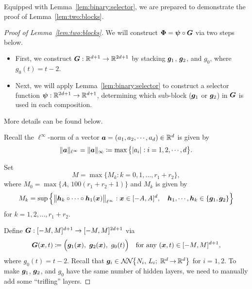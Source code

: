 \documentclass[nohyperref]{article}
\theoremstyle{plain}
\theoremstyle{definition}
\theoremstyle{remark}
\begin{document}
Equipped with Lemma~\ref{lem:binary:selector}, we are prepared to demonstrate the proof of Lemma~\ref{lem:two:blocks}.
\begin{proof}[Proof of Lemma~\ref{lem:two:blocks}]
	We will construct ${\bm{\Phi}}={\bm{\psi}}\circ {\bm{G}}$ via two steps below.
	\begin{itemize}
		\item First, we construct $\bmG:\R^{d+1}\to\R^{2d+1}$  by stacking ${\bm{g}}_1$, ${\bm{g}}_2$, and $g_0$, where $g_0(t)=t-2$.
		\item Next, we will apply Lemma~\ref{lem:binary:selector} to construct a selector function $\bmpsi:\R^{2d+1}\to\R^{d+1}$, determining which sub-block (${\bm{g}}_1$ or ${\bm{g}}_2$) in ${\bm{G}}$ is used in each composition.
	\end{itemize} 
	More details can be found below.
	
	
	
	
	
			Recall the $\ell^\infty$-norm of a vector $\bma=(a_1,a_2,\dotsc,a_d)\in \R^d$ is given by
	\begin{equation*}
		\|\bma\|_{\ell^\infty}=\|\bma\|_{\infty}\coloneqq \max\big\{|a_i|:i=1,2,\dotsc,d\big\}.
	\end{equation*}
	
	Set 	
		\begin{equation*}
		M=\max\{M_k:k=0,1,\dotsc,r_1+r_2\},
	\end{equation*}
	where $M_0=\max\{A,\, 100(r_1+r_2+1)\}$ and $M_k$ is given by
	\begin{equation*}
		M_k= \sup\Big\{\big\|\bmh_{k}\circ\cdots\circ\bmh_1(\bmx)\big\|_{\ell^\infty}:\bmx\in [-A,A]^d,\quad   \bmh_1,\dotsc,\bmh_k\in \{\bmg_1,\bmg_2\}\Big\}
	\end{equation*}
	for $k=1,2,\dotsc,r_1+r_2$.
	
	Define ${\bm{G}}:[-M,M]^{d+1}\to [-M,M]^{2d+1}$ via
	\begin{equation*}
		{\bm{G}}({\bm{x}},t)\coloneqq \Big({\bm{g}}_1({\bm{x}}),\   {\bm{g}}_2({\bm{x}}),\   g_0(t)\Big)\quad \textnormal{for any $({\bm{x}},t)\in [-M,M]^{d+1}$,}
	\end{equation*}
	where $g_0(t)=t-2$. 
	Recall that $\bmg_i\in \nn[\big]{N_i}{L_i}{d}{d}$ for $i=1,2$.
	To make ${\bm{g}}_1$, ${\bm{g}}_2$,  and $g_0$ have the same number of hidden layers, we need to manually add some ``trifling'' layers.
	

\end{proof}
\end{document}
